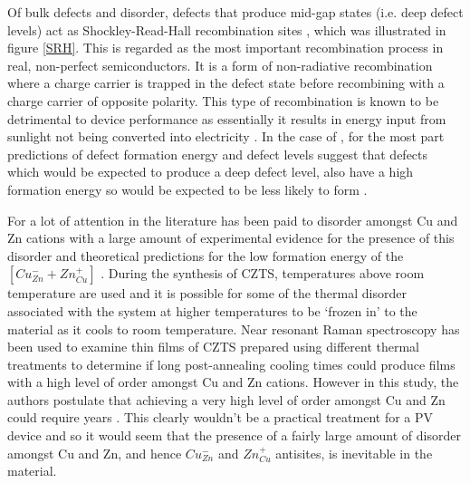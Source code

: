 Of bulk defects and disorder, defects that produce mid-gap states (i.e. deep defect levels) act as Shockley-Read-Hall recombination sites \cite{SRH}, which was illustrated in figure \ref{SRH}. This is regarded as the most important recombination process in real, non-perfect semiconductors. It is a form of non-radiative recombination where a charge carrier is trapped in the defect state before recombining with a charge carrier of opposite polarity. This type of recombination is known to be detrimental to device performance as essentially  it results in energy input from sunlight not being converted into electricity \cite{Nelson4}.
In the case of {\CZTS}, for the most part predictions of defect formation energy and defect levels suggest that defects which would be expected to produce a deep defect level, also have a high formation energy so would be expected to be less likely to form \cite{defect1}.

For {\CZTS} a lot of attention in the literature has been paid to disorder amongst Cu and Zn cations with a large amount of experimental evidence for the presence of this disorder \cite{Schorr, CZTS_Xray, CZTS_TEM} and theoretical predictions for the low formation energy of the  $[Cu_{Zn}^{-} + Zn_{Cu}^{+}]$ \cite{defect1}.
During the synthesis of CZTS, temperatures above room temperature are used and it is possible for some of the thermal disorder associated with the system at higher temperatures to be `frozen in' to the material as it cools to room temperature.
Near resonant Raman spectroscopy has been used to examine thin films of CZTS prepared using different thermal treatments to determine if long post-annealing cooling times could produce films with a high level of order amongst Cu and Zn cations. However in this study, the authors postulate that achieving a very high level of order amongst Cu and Zn could require years \cite{Katharina}. This clearly wouldn't be a practical treatment for a PV device and so it would seem that the presence of a fairly large amount of disorder amongst Cu and Zn, and hence $Cu_{Zn}^{-}$ and $Zn_{Cu}^{+}$ antisites,  is inevitable in the material.

